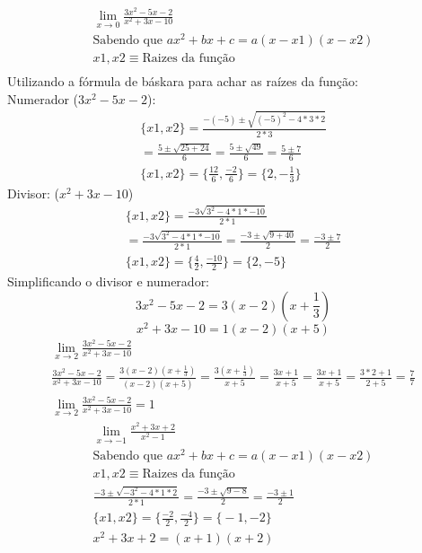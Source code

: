 \documentclass{jhwhw}
\begin{document}
\newpage
{}
\begin{multline*}
    \lim_{x \to 0} \frac{3x^2 - 5x - 2}{x^2 + 3x - 10} \\
    \text{Sabendo que $ax^2 + bx + c = a(x-x1)(x-x2)$} \\
    x1, x2 \equiv \text{Raizes da função} \\
\end{multline*}
Utilizando a fórmula de báskara para achar as raízes da função:\\
Numerador ($3x^2 -5x -2$):
\begin{multline*}
    \{x1, x2\} = \frac{-(-5) \pm \sqrt{(-5)^2 - 4 * 3 * 2}}{2*3} \\
    = \frac{5 \pm \sqrt{25 + 24}}{6} = \frac{5 \pm \sqrt{49}}{6} = \frac{5 \pm 7}{6} \\
    \boxed{\{x1, x2\} = \biggl\{\frac{12}{6}, \frac{-2}{6}\biggr\} = \biggl\{2, -\frac{1}{3}\biggr\}}
\end{multline*}
Divisor: ($x^2 + 3x - 10$)
\begin{multline*}
    \{x1, x2\} = \frac{-3 \sqrt{3^2 - 4 * 1 * -10}}{2*1} \\= \frac{-3 \sqrt{3^2 - 4 * 1 * -10}}{2*1} = \frac{-3 \pm \sqrt{9 + 40}}{2} = \frac{-3 \pm 7}{2} \\
    \boxed{\{x1, x2\} = \biggl\{\frac{4}{2}, \frac{-10}{2}\biggr\} = \biggl\{2, -5\biggr\}}
\end{multline*}
Simplificando o divisor e numerador:
\begin{equation*}
    3x^2 - 5x - 2 = 3(x-2)(x+\frac{1}{3})
\end{equation*}
\begin{equation*}
    x^2 + 3x - 10 = 1(x-2)(x+5)
\end{equation*}
\begin{multline*}
    \lim_{x \to 2} \frac{3x^2 - 5x - 2}{x^2 + 3x - 10} \\ \frac{3x^2 - 5x - 2}{x^2 + 3x - 10} = \frac{3(x-2)(x+\frac{1}{3})}{(x-2)(x+5)} = \frac{3(x+\frac{1}{3})}{x+5} = \frac{3x+1}{x+5} = \frac{3x+1}{x+5} = \frac{3*2+1}{2+5} = \frac{7}{7} \\
    \boxed{\lim_{x \to 2} \frac{3x^2 - 5x - 2}{x^2 + 3x - 10} = 1}
\end{multline*}
\newpage
{}
\begin{multline*}
    \lim_{x \to -1} \frac{x^2 + 3x + 2}{x^2 -1} \\
    \text{Sabendo que $ax^2 + bx + c = a(x-x1)(x-x2)$} \\
    x1, x2 \equiv \text{Raizes da função} \\
    \frac{-3 \pm \sqrt{-3^2-4*1*2}}{2*1} = \frac{-3 \pm \sqrt{9-8}}{2} = \frac{-3\pm1}{2}\\
    \{x1, x2\} = \biggl\{\frac{-2}{2}, \frac{-4}{2}\biggr\} = \biggl\{-1, -2\biggr\} \\
    x^2 + 3x + 2 = (x+1)(x+2)
\end{multline*}
\end{document}
